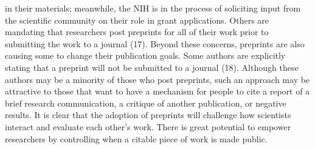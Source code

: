 \documentclass[11pt,]{article}
\begin{document}
in their materials; meanwhile, the NIH is in the process of soliciting
input from the scientific community on their role in grant applications.
Others are mandating that researchers post preprints for all of their
work prior to submitting the work to a journal (17). Beyond these
concerns, preprints are also causing some to change their publication
goals. Some authors are explicitly stating that a preprint will not be
submitted to a journal (18). Although these authors may be a minority of
those who post preprints, such an approach may be attractive to those
that want to have a mechanism for people to cite a report of a brief
research communication, a critique of another publication, or negative
results. It is clear that the adoption of preprints will challenge how
scientists interact and evaluate each other's work. There is great
potential to empower researchers by controlling when a citable piece of
work is made public.
\end{document}
